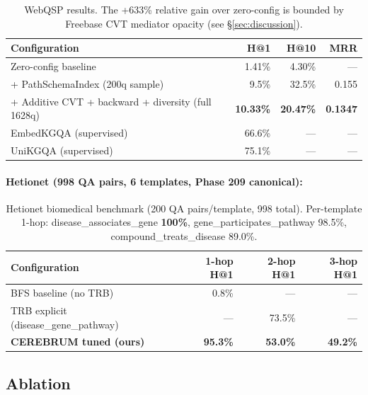 \documentclass[11pt,a4paper]{article}
\begin{document}
\begin{table}[h]
\centering
\begin{tabular}{lrrr}
\toprule
\textbf{Configuration} & \textbf{H@1} & \textbf{H@10} & \textbf{MRR} \\
\midrule
Zero-config baseline & 1.41\% & 4.30\% & — \\
+ PathSchemaIndex (200q sample) & 9.5\%  & 32.5\% & 0.155 \\
+ Additive CVT + backward + diversity (full 1628q) & \textbf{10.33\%} & \textbf{20.47\%} & \textbf{0.1347} \\
\midrule
EmbedKGQA \cite{saxena2020improve} (supervised) & 66.6\% & — & — \\
UniKGQA \cite{jiang2023} (supervised) & 75.1\% & — & — \\
\bottomrule
\end{tabular}
\caption{WebQSP results. The +633\% relative gain over zero-config is bounded
by Freebase CVT mediator opacity (see \S\ref{sec:discussion}).}
\label{tab:webqsp}
\end{table}

\paragraph{Hetionet (998 QA pairs, 6 templates, Phase 209 canonical):}

\begin{table}[h]
\centering
\begin{tabular}{lrrr}
\toprule
\textbf{Configuration} & \textbf{1-hop H@1} & \textbf{2-hop H@1} & \textbf{3-hop H@1} \\
\midrule
BFS baseline (no TRB)         & 0.8\%  & —      & —      \\
TRB explicit (disease\_gene\_pathway) & — & 73.5\% & —   \\
\textbf{CEREBRUM tuned (ours)} & \textbf{95.3\%} & \textbf{53.0\%} & \textbf{49.2\%} \\
\bottomrule
\end{tabular}
\caption{Hetionet biomedical benchmark (200 QA pairs/template, 998 total).
Per-template 1-hop: disease\_associates\_gene \textbf{100\%},
gene\_participates\_pathway 98.5\%, compound\_treats\_disease 89.0\%.}
\label{tab:hetionet}
\end{table}

\subsection{Ablation}
\label{sec:fanova}
\end{document}
